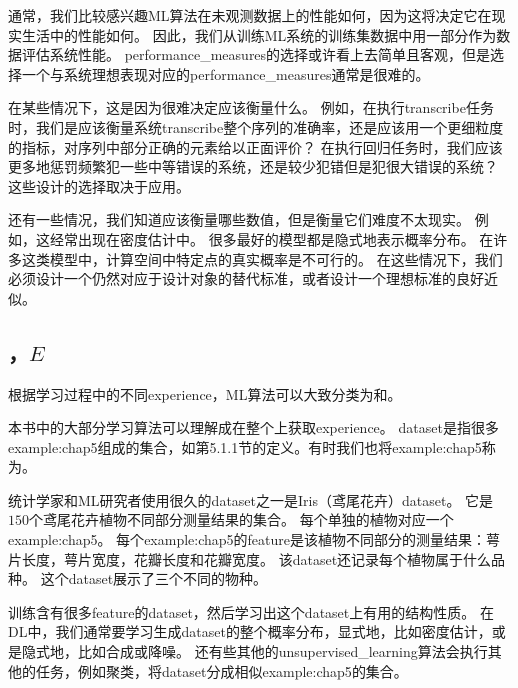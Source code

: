 
通常，我们比较感兴趣\gls{ML}算法在未观测数据上的性能如何，因为这将决定它在现实生活中的性能如何。
因此，我们从训练\gls{ML}系统的训练集数据中用一部分作为数据评估系统性能。
\gls{performance_measures}的选择或许看上去简单且客观，但是选择一个与系统理想表现对应的\gls{performance_measures}通常是很难的。

在某些情况下，这是因为很难决定应该衡量什么。
例如，在执行\gls{transcribe}任务时，我们是应该衡量系统\gls{transcribe}整个序列的准确率，还是应该用一个更细粒度的指标，对序列中部分正确的元素给以正面评价？
在执行回归任务时，我们应该更多地惩罚频繁犯一些中等错误的系统，还是较少犯错但是犯很大错误的系统？
这些设计的选择取决于应用。

还有一些情况，我们知道应该衡量哪些数值，但是衡量它们难度不太现实。
例如，这经常出现在密度估计中。
很多最好的模型都是隐式地表示概率分布。
在许多这类模型中，计算空间中特定点的真实概率是不可行的。
在这些情况下，我们必须设计一个仍然对应于设计对象的替代标准，或者设计一个理想标准的良好近似。

\subsection{，$E$}
\label{sec:the_experience_e}
根据学习过程中的不同\gls{experience}，\gls{ML}算法可以大致分类为和。

本书中的大部分学习算法可以理解成在整个上获取\gls{experience}。
\gls{dataset}是指很多\gls{example:chap5}组成的集合，如第5.1.1节的定义。有时我们也将\gls{example:chap5}称为。


统计学家和\gls{ML}研究者使用很久的\gls{dataset}之一是Iris（鸢尾花卉）\gls{dataset}\citep{Fisher-1936}。
它是$150$个鸢尾花卉植物不同部分测量结果的集合。
每个单独的植物对应一个\gls{example:chap5}。
每个\gls{example:chap5}的\gls{feature}是该植物不同部分的测量结果：萼片长度，萼片宽度，花瓣长度和花瓣宽度。
该\gls{dataset}还记录每个植物属于什么品种。
这个\gls{dataset}展示了三个不同的物种。

训练含有很多\gls{feature}的\gls{dataset}，然后学习出这个\gls{dataset}上有用的结构性质。
在\gls{DL}中，我们通常要学习生成\gls{dataset}的整个概率分布，显式地，比如密度估计，或是隐式地，比如合成或降噪。
还有些其他的\gls{unsupervised_learning}算法会执行其他的任务，例如聚类，将\gls{dataset}分成相似\gls{example:chap5}的集合。

